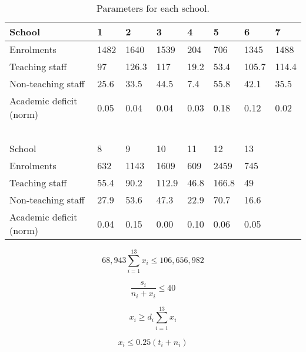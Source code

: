 \documentclass[11pt, a4paper]{article}
\begin{document}
    \begin{table}[!ht]
        \centering
        \caption{Parameters for each school.}
        \begin{tabular}{|l|l|l|l|l|l|l|l|}
            \hline
                School & 1 & 2 & 3 & 4 & 5 & 6 & 7 \\ \hline
                Enrolments & 1482 & 1640 & 1539 & 204 & 706 & 1345 & 1488 \\ \hline
                Teaching staff & 97 & 126.3 & 117 & 19.2 & 53.4 & 105.7 & 114.4 \\ \hline
                Non-teaching staff & 25.6 & 33.5 & 44.5 & 7.4 & 55.8 & 42.1 & 35.5 \\ \hline
                Academic deficit (norm) & 0.05 & 0.04 & 0.04 & 0.03 & 0.18 & 0.12 & 0.02 \\ \hline
                ~ & ~ & ~ & ~ & ~ & ~ & ~ & ~ \\ \hline
                School & 8 & 9 & 10 & 11 & 12 & 13 & ~ \\ \hline
                Enrolments & 632 & 1143 & 1609 & 609 & 2459 & 745 & ~ \\ \hline
                Teaching staff & 55.4 & 90.2 & 112.9 & 46.8 & 166.8 & 49 & ~ \\ \hline
                Non-teaching staff & 27.9 & 53.6 & 47.3 & 22.9 & 70.7 & 16.6 & ~ \\ \hline
                Academic deficit (norm) & 0.04 & 0.15 & 0.00 & 0.10 & 0.06 & 0.05 & ~ \\ \hline
        \end{tabular}
        \label{params}
    \end{table}

    \begin{equation}
        68,943\sum_{i=1}^{13} x_i \leq 106,656,982
        \label{first_constraint3}
    \end{equation}

    \begin{equation}
        \frac{s_i}{n_i + x_i} \leq 40
    \end{equation}

    \begin{equation}
        x_i \geq d_i\sum_{i=1}^{13} x_i
    \end{equation}

    \begin{equation}
        x_i \leq 0.25(t_i + n_i)
        \label{last_constraint3}
    \end{equation}
\end{document}

